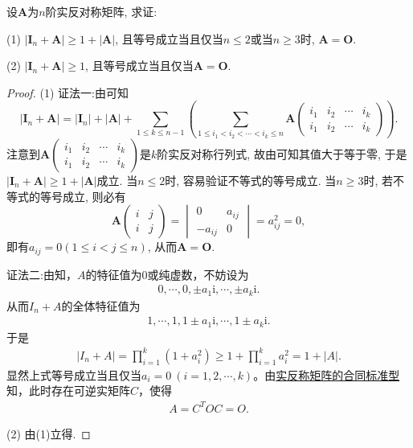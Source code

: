 \documentclass[../../main.tex]{subfiles}%
\begin{document}
\begin{proposition}\label{proposition:反称矩阵A的I_n+A的行列式相关结论}
设$\boldsymbol{A}$为$n$阶实反对称矩阵, 求证:

(1) $|\boldsymbol{I}_n+\boldsymbol{A}|\geqslant  1 + |\boldsymbol{A}|$, 且等号成立当且仅当$n\leqslant  2$或当$n\geqslant  3$时, $\boldsymbol{A}=\boldsymbol{O}$.

(2) $|\boldsymbol{I}_n+\boldsymbol{A}|\geqslant  1$, 且等号成立当且仅当$\boldsymbol{A}=\boldsymbol{O}$.
\end{proposition}
\begin{proof}

(1) {\color{blue}证法一:}由可知
\[
|\boldsymbol{I}_n+\boldsymbol{A}| = |\boldsymbol{I}_n|+|\boldsymbol{A}|+\sum_{1\leqslant  k\leqslant  n - 1}\left(\sum_{1\leqslant  i_1 < i_2 < \cdots < i_k\leqslant  n} \boldsymbol{A}\begin{pmatrix}
i_1 & i_2 & \cdots & i_k \\
i_1 & i_2 & \cdots & i_k
\end{pmatrix}\right).
\]
注意到$\boldsymbol{A}\begin{pmatrix}
i_1 & i_2 & \cdots & i_k \\
i_1 & i_2 & \cdots & i_k
\end{pmatrix}$是$k$阶实反对称行列式, 故由可知其值大于等于零, 于是$|\boldsymbol{I}_n+\boldsymbol{A}|\geqslant  1 + |\boldsymbol{A}|$成立. 当$n\leqslant  2$时, 容易验证不等式的等号成立. 当$n\geqslant  3$时, 若不等式的等号成立, 则必有
\[
\boldsymbol{A}\begin{pmatrix}
i & j \\
i & j
\end{pmatrix}=\begin{vmatrix}
0 & a_{ij} \\
-a_{ij} & 0
\end{vmatrix}=a_{ij}^2 = 0,
\]
即有$a_{ij} = 0 (1\leqslant  i < j\leqslant  n)$, 从而$\boldsymbol{A}=\boldsymbol{O}$.

{\color{blue}证法二:}由知，$A$的特征值为$0$或纯虚数，不妨设为
\begin{align*}
0, \cdots, 0, \pm a_1\mathrm{i}, \cdots, \pm a_k\mathrm{i}.
\end{align*}
从而$I_n + A$的全体特征值为
\begin{align*}
1, \cdots, 1, 1 \pm a_1\mathrm{i}, \cdots, 1 \pm a_k\mathrm{i}.
\end{align*}
于是
\begin{align*}
|I_n + A| = \prod_{i=1}^k (1 + a_i^2) \geqslant 1 + \prod_{i=1}^k a_i^2 = 1 + |A|.
\end{align*}
显然上式等号成立当且仅当$a_i = 0\ (i = 1,2,\cdots,k)$。由\hyperref[theorem:反对称矩阵的合同标准型]{实反称矩阵的合同标准型}知，此时存在可逆实矩阵$C$，使得
\begin{align*}
A = C^T O C = O.
\end{align*}

(2) 由(1)立得.

\end{proof}
\end{document}
